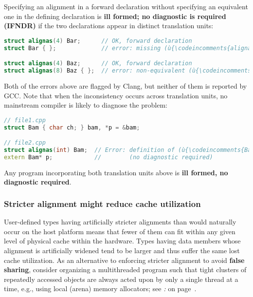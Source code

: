 \noindent Specifying an alignment in a forward declaration without specifying an
equivalent one in the defining declaration is \textbf{ill formed; no diagnostic
is required (IFNDR)} if the two declarations appear in distinct translation
units:

\begin{lstlisting}[language=C++]
struct alignas(4) Bar;      // OK, forward declaration
struct Bar { };             // error: missing (ù{\codeincomments{alignas}}ù) specifier

struct alignas(4) Baz;      // OK, forward declaration
struct alignas(8) Baz { };  // error: non-equivalent (ù{\codeincomments{alignas}}ù) specifier
\end{lstlisting}
    
\noindent Both of the errors above are flagged by Clang, but neither of them is
reported by GCC. Note that when the inconsistency occurs across
translation units, no mainstream compiler is likely to diagnose the
problem:

\begin{lstlisting}[language=C++]
// file1.cpp
struct Bam { char ch; } bam, *p = &bam;

// file2.cpp
struct alignas(int) Bam;  // Error: definition of (ù{\codeincomments{Bam}}ù) lacks alignment specifier.
extern Bam* p;            //        (no diagnostic required)
\end{lstlisting}
    
\noindent Any program incorporating both translation units above is
\textbf{ill formed, no diagnostic required}.

\subsubsection[Stricter alignment might reduce cache utilization]{Stricter alignment might reduce cache utilization}\label{stricter-alignment-might-reduce-cache-utilization}

User-defined types having artificially stricter alignments than would
naturally occur on the host platform means that fewer of them can fit
within any given level of physical cache within the hardware. Types
having data members whose alignment is artificially widened tend to be
larger and thus suffer the same lost cache utilization. As an
alternative to enforcing stricter alignment to avoid \textbf{false
sharing}, consider organizing a multithreaded program such that tight
clusters of repeatedly accessed objects are always acted upon by only a
single thread at a time, e.g., using local (arena) memory allocators;
see {\it{}:} {\it{}} on page~\pageref{cache-lines,-l1,-l2,-and-l3-cache,-pages,-and-virtual-memory}. 

